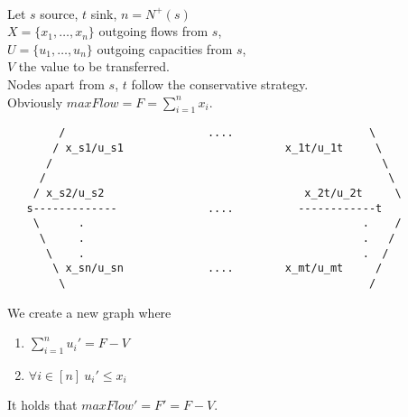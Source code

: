 \begin{theorem} \ \\
   \label{trusttransfer}
   Let $s$ source, $t$ sink, $n = N^{+}(s)$ \\
   $X = \{x_1, \dots, x_n\}$ outgoing flows from $s$, \\
   $U = \{u_1, \dots, u_n\}$ outgoing capacities from $s$, \\
   $V$ the value to be transferred. \\
   Nodes apart from $s$, $t$ follow the conservative strategy. \\
   Obviously $maxFlow = F = \sum\limits_{i=1}^{n}{x_i}$.
   {\em \begin{lstlisting}
        /                      ....                     \
       / x_s1/u_s1                         x_1t/u_1t     \
      /                                                   \
     /                                                     \
    / x_s2/u_s2                               x_2t/u_2t     \
   s-------------              ....          ------------t
    \      .                                           .    /
     \     .                                           .   /
      \    .                                           .  /
       \ x_sn/u_sn             ....        x_mt/u_mt     /
        \                                               /
   \end{lstlisting}}
   We create a new graph where
   \begin{enumerate}
     \item  $\sum\limits_{i=1}^{n}{u_i'} = F - V$
     \item $\forall i \in [n] \: u_i' \leq x_i$
   \end{enumerate}

   It holds that $maxFlow' = F' = F - V$.
\end{theorem}
